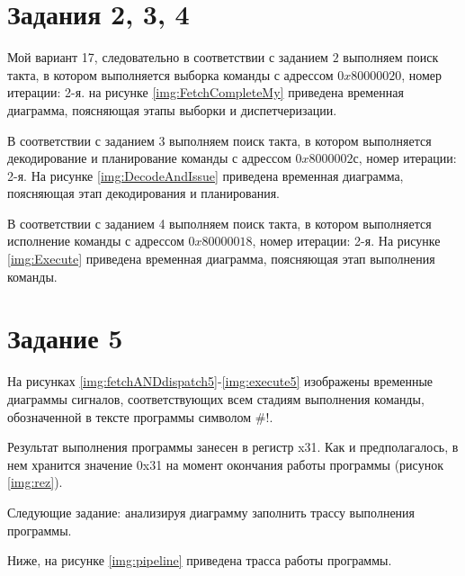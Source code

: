 \chapter{Задания 2, 3, 4}
\label{cha:impl}

Мой вариант 17, следовательно в соответствии с заданием $2$ выполняем поиск такта, в котором выполняется выборка команды с адрессом $0x80000020$, номер итерации: 2-я. на рисунке \ref{img:FetchCompleteMy} приведена временная диаграмма, поясняющая этапы выборки и диспетчеризации.


В соответствии с заданием 3 выполняем поиск такта, в котором выполняется декодирование и планирование команды с адрессом $0x8000002$с, номер итерации: 2-я. На рисунке \ref{img:DecodeAndIssue} приведена временная диаграмма, поясняющая этап декодирования и планирования.


В соответствии с заданием 4 выполняем поиск такта, в котором выполняется исполнение команды с адрессом $0x80000018$, номер итерации: 2-я. На рисунке \ref{img:Execute} приведена временная диаграмма, поясняющая этап выполнения команды.


\chapter{Задание 5}
На рисунках \ref{img:fetchANDdispatch5}-\ref{img:execute5} изображены временные диаграммы сигналов, соответствующих всем стадиям выполнения команды, обозначенной в тексте программы символом \#!.



\newpage
{}

Результат выполнения программы занесен в регистр x31. Как и предполагалось, в нем хранится значение 0x31 на момент окончания работы программы (рисунок \ref{img:rez}).


Следующие задание: анализируя диаграмму заполнить трассу выполнения программы.

Ниже, на рисунке \ref{img:pipeline} приведена трасса работы программы.

